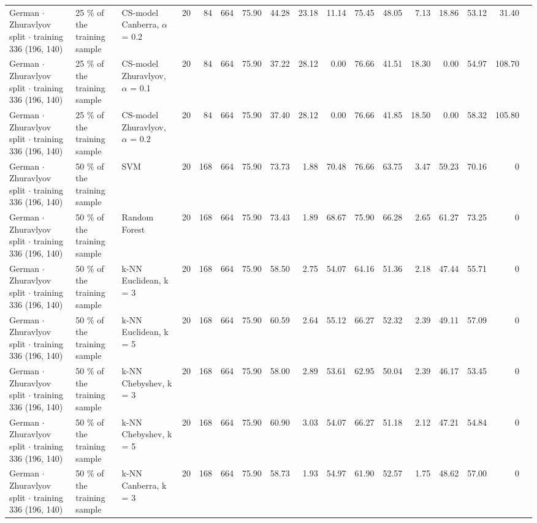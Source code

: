 \begin{longtable}{lllrrrrrrrrrrrrrl}
  German $\cdot$ Zhuravlyov split $\cdot$ training 336 (196, 140) & 25 \% of the training sample & CS-model Canberra, $\alpha$ = 0.2 & 20 & 84 & 664 & 75.90 & 44.28 & 23.18 & 11.14 & 75.45 & 48.05 & 7.13 & 18.86 & 53.12 & 31.40 &  \\
  German $\cdot$ Zhuravlyov split $\cdot$ training 336 (196, 140) & 25 \% of the training sample & CS-model Zhuravlyov, $\alpha$ = 0.1 & 20 & 84 & 664 & 75.90 & 37.22 & 28.12 & 0.00 & 76.66 & 41.51 & 18.30 & 0.00 & 54.97 & 108.70 &  \\
  German $\cdot$ Zhuravlyov split $\cdot$ training 336 (196, 140) & 25 \% of the training sample & CS-model Zhuravlyov, $\alpha$ = 0.2 & 20 & 84 & 664 & 75.90 & 37.40 & 28.12 & 0.00 & 76.66 & 41.85 & 18.50 & 0.00 & 58.32 & 105.80 &  \\
  German $\cdot$ Zhuravlyov split $\cdot$ training 336 (196, 140) & 50 \% of the training sample & SVM & 20 & 168 & 664 & 75.90 & 73.73 & 1.88 & 70.48 & 76.66 & 63.75 & 3.47 & 59.23 & 70.16 & 0 &  \\
  German $\cdot$ Zhuravlyov split $\cdot$ training 336 (196, 140) & 50 \% of the training sample & Random Forest & 20 & 168 & 664 & 75.90 & 73.43 & 1.89 & 68.67 & 75.90 & 66.28 & 2.65 & 61.27 & 73.25 & 0 &  \\
  German $\cdot$ Zhuravlyov split $\cdot$ training 336 (196, 140) & 50 \% of the training sample & k-NN Euclidean, k = 3 & 20 & 168 & 664 & 75.90 & 58.50 & 2.75 & 54.07 & 64.16 & 51.36 & 2.18 & 47.44 & 55.71 & 0 &  \\
  German $\cdot$ Zhuravlyov split $\cdot$ training 336 (196, 140) & 50 \% of the training sample & k-NN Euclidean, k = 5 & 20 & 168 & 664 & 75.90 & 60.59 & 2.64 & 55.12 & 66.27 & 52.32 & 2.39 & 49.11 & 57.09 & 0 &  \\
  German $\cdot$ Zhuravlyov split $\cdot$ training 336 (196, 140) & 50 \% of the training sample & k-NN Chebyshev, k = 3 & 20 & 168 & 664 & 75.90 & 58.00 & 2.89 & 53.61 & 62.95 & 50.04 & 2.39 & 46.17 & 53.45 & 0 &  \\
  German $\cdot$ Zhuravlyov split $\cdot$ training 336 (196, 140) & 50 \% of the training sample & k-NN Chebyshev, k = 5 & 20 & 168 & 664 & 75.90 & 60.90 & 3.03 & 54.07 & 66.27 & 51.18 & 2.12 & 47.21 & 54.84 & 0 &  \\
  German $\cdot$ Zhuravlyov split $\cdot$ training 336 (196, 140) & 50 \% of the training sample & k-NN Canberra, k = 3 & 20 & 168 & 664 & 75.90 & 58.73 & 1.93 & 54.97 & 61.90 & 52.57 & 1.75 & 48.62 & 57.00 & 0 &  \\

\end{longtable}
